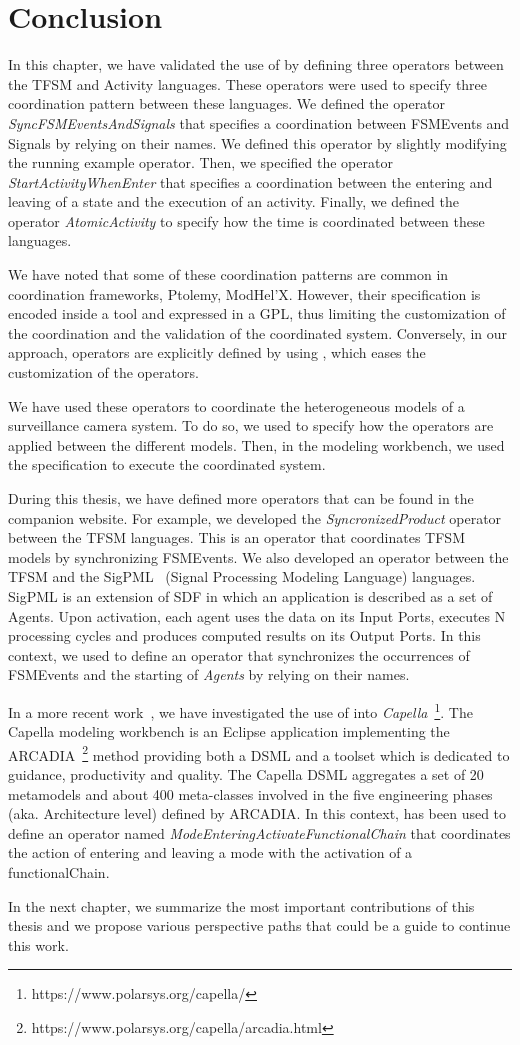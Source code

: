 \section{Conclusion}
In this chapter, we have validated the use of \bcool by defining three operators between the TFSM and Activity languages. These operators were used to specify three coordination pattern between these languages. We defined the operator \emph{SyncFSMEventsAndSignals} that specifies a coordination between FSMEvents and Signals by relying on their names. We defined this operator by slightly modifying the running example operator. Then, we specified the operator \emph{StartActivityWhenEnter} that specifies a coordination between the entering and leaving of a state and the execution of an activity. Finally, we defined the operator \emph{AtomicActivity} to specify how the time is coordinated between these languages.
	
We have noted that some of these coordination patterns are common in coordination frameworks, \eg Ptolemy, ModHel'X. However, their specification is encoded inside a tool and expressed in a GPL, thus limiting the customization of the coordination and the validation of the coordinated system. Conversely, in our approach, operators are explicitly defined by using \bcool, which eases the customization of the operators.
	
We have used these operators to coordinate the heterogeneous models of a surveillance camera system. To do so, we used \bflow to specify how the operators are applied between the different models. Then, in the modeling workbench, we used the \bflow specification to execute the coordinated system.  
	
	
During this thesis, we have defined more operators that can be found in the companion website. For example, we developed the \emph{SyncronizedProduct} operator between the TFSM languages. This is an operator that coordinates TFSM models by synchronizing FSMEvents. We also developed an operator between the TFSM and the SigPML~\cite{moccmlbib} (Signal Processing Modeling Language) languages. SigPML is an extension of SDF in which an application is described as a set of Agents. Upon activation, each agent uses the data on its Input Ports, executes N processing cycles and produces computed results on its Output Ports. In this context, we used \bcool to define an operator that synchronizes the occurrences of FSMEvents and the starting of \emph{Agents} by relying on their names. 

In a more recent work~\cite{combemaleerts16bib}, we have investigated the use of \bcool into \emph{Capella}~\footnote{https://www.polarsys.org/capella/}. The Capella modeling workbench is an Eclipse application implementing the ARCADIA~\footnote{https://www.polarsys.org/capella/arcadia.html} method providing both a DSML and a toolset which is dedicated to guidance, productivity and quality. The Capella DSML aggregates a set of 20 metamodels and about 400 meta-classes involved in the five engineering phases (aka. Architecture level) defined by ARCADIA. In this context, \bcool has been used to define an operator named \emph{ModeEnteringActivateFunctionalChain} that coordinates the action of entering and leaving a mode with the activation of a functionalChain.
	
In the next chapter, we summarize the most important contributions of this thesis and we propose various perspective paths that could be a guide to continue this work. 
	
